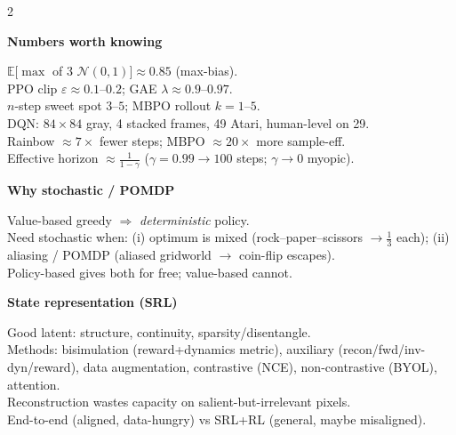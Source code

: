 \documentclass[a4paper]{article}
\newcommand{\hd}[1]{%
  \par\addvspace{3.6pt}%
  {\color{accent}\bfseries\small #1}\par
  \vspace{-4pt}{\color{accent!45}\rule{\linewidth}{0.4pt}}\par\vspace{1.2pt}}
\newcommand{\E}{\mathbb{E}}
\newcommand{\Normal}{\mathcal{N}}
\begin{document}
\begin{multicols}{2}
\hd{Numbers worth knowing}
$\E[\max$ of 3 $\Normal(0,1)]\approx0.85$ (max-bias).\\
PPO clip $\varepsilon\approx0.1$–$0.2$; GAE $\lambda\approx0.9$–$0.97$.\\
$n$-step sweet spot $3$–$5$; MBPO rollout $k{=}1$–$5$.\\
DQN: $84{\times}84$ gray, 4 stacked frames, 49 Atari, human-level on 29.\\
Rainbow $\approx7\times$ fewer steps; MBPO $\approx20\times$ more sample-eff.\\
Effective horizon $\approx\tfrac1{1-\gamma}$ ($\gamma{=}0.99\to100$ steps; $\gamma{\to}0$ myopic).

\hd{Why stochastic / POMDP}
Value-based greedy $\Rightarrow$ \emph{deterministic} policy.\\
Need stochastic when: (i) optimum is mixed (rock–paper–scissors $\to\tfrac13$ each); (ii) aliasing / POMDP (aliased gridworld $\to$ coin-flip escapes).\\
Policy-based gives both for free; value-based cannot.

\hd{State representation (SRL)}
Good latent: structure, continuity, sparsity/disentangle.\\
Methods: bisimulation (reward+dynamics metric), auxiliary (recon/fwd/inv-dyn/reward), data augmentation, contrastive (NCE), non-contrastive (BYOL), attention.\\
Reconstruction wastes capacity on salient-but-irrelevant pixels.\\
End-to-end (aligned, data-hungry) vs SRL+RL (general, maybe misaligned).

\end{multicols}
\end{document}
